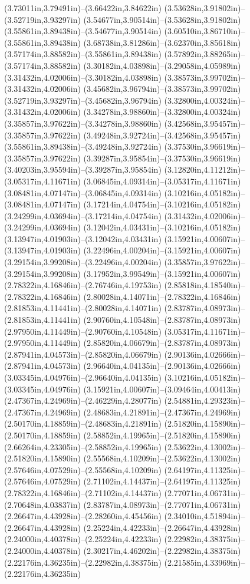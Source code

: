 (3.73011in,3.79491in)--(3.66422in,3.84622in) (3.53628in,3.91802in)--(3.52719in,3.93297in) (3.54677in,3.90514in)--(3.53628in,3.91802in) (3.55861in,3.89438in)--(3.54677in,3.90514in) (3.60510in,3.86710in)--(3.55861in,3.89438in) (3.68738in,3.81286in)--(3.62370in,3.85618in) (3.57174in,3.88582in)--(3.55861in,3.89438in) (3.57892in,3.88265in)--(3.57174in,3.88582in) (3.30182in,4.03898in)--(3.29058in,4.05989in) (3.31432in,4.02006in)--(3.30182in,4.03898in) (3.38573in,3.99702in)--(3.31432in,4.02006in) (3.45682in,3.96794in)--(3.38573in,3.99702in) (3.52719in,3.93297in)--(3.45682in,3.96794in) (3.32800in,4.00324in)--(3.31432in,4.02006in) (3.34278in,3.98860in)--(3.32800in,4.00324in) (3.35857in,3.97622in)--(3.34278in,3.98860in) (3.42568in,3.95457in)--(3.35857in,3.97622in) (3.49248in,3.92724in)--(3.42568in,3.95457in) (3.55861in,3.89438in)--(3.49248in,3.92724in) (3.37530in,3.96619in)--(3.35857in,3.97622in) (3.39287in,3.95854in)--(3.37530in,3.96619in) (3.40203in,3.95594in)--(3.39287in,3.95854in) (3.12820in,4.11212in)--(3.05317in,4.11671in) (3.06845in,4.09314in)--(3.05317in,4.11671in) (3.08481in,4.07147in)--(3.06845in,4.09314in) (3.10216in,4.05182in)--(3.08481in,4.07147in) (3.17214in,4.04754in)--(3.10216in,4.05182in) (3.24299in,4.03694in)--(3.17214in,4.04754in) (3.31432in,4.02006in)--(3.24299in,4.03694in) (3.12042in,4.03431in)--(3.10216in,4.05182in) (3.13947in,4.01903in)--(3.12042in,4.03431in) (3.15921in,4.00607in)--(3.13947in,4.01903in) (3.22496in,4.00204in)--(3.15921in,4.00607in) (3.29154in,3.99208in)--(3.22496in,4.00204in) (3.35857in,3.97622in)--(3.29154in,3.99208in) (3.17952in,3.99549in)--(3.15921in,4.00607in) (2.78322in,4.16846in)--(2.76746in,4.19753in) (2.85818in,4.18540in)--(2.78322in,4.16846in) (2.80028in,4.14071in)--(2.78322in,4.16846in) (2.81853in,4.11441in)--(2.80028in,4.14071in) (2.83787in,4.08973in)--(2.81853in,4.11441in) (2.90760in,4.10548in)--(2.83787in,4.08973in) (2.97950in,4.11449in)--(2.90760in,4.10548in) (3.05317in,4.11671in)--(2.97950in,4.11449in) (2.85820in,4.06679in)--(2.83787in,4.08973in) (2.87941in,4.04573in)--(2.85820in,4.06679in) (2.90136in,4.02666in)--(2.87941in,4.04573in) (2.96640in,4.04135in)--(2.90136in,4.02666in) (3.03345in,4.04976in)--(2.96640in,4.04135in) (3.10216in,4.05182in)--(3.03345in,4.04976in) (3.15921in,4.00607in)--(3.09464in,4.00413in) (2.47367in,4.24969in)--(2.46229in,4.28077in) (2.54881in,4.29323in)--(2.47367in,4.24969in) (2.48683in,4.21891in)--(2.47367in,4.24969in) (2.50170in,4.18859in)--(2.48683in,4.21891in) (2.51820in,4.15890in)--(2.50170in,4.18859in) (2.58852in,4.19965in)--(2.51820in,4.15890in) (2.66264in,4.23305in)--(2.58852in,4.19965in) (2.53622in,4.13002in)--(2.51820in,4.15890in) (2.55568in,4.10209in)--(2.53622in,4.13002in) (2.57646in,4.07529in)--(2.55568in,4.10209in) (2.64197in,4.11325in)--(2.57646in,4.07529in) (2.71102in,4.14437in)--(2.64197in,4.11325in) (2.78322in,4.16846in)--(2.71102in,4.14437in) (2.77071in,4.06731in)--(2.70648in,4.03837in) (2.83787in,4.08973in)--(2.77071in,4.06731in) (2.26647in,4.43928in)--(2.28260in,4.45456in) (2.34010in,4.51894in)--(2.26647in,4.43928in) (2.25224in,4.42233in)--(2.26647in,4.43928in) (2.24000in,4.40378in)--(2.25224in,4.42233in) (2.22982in,4.38375in)--(2.24000in,4.40378in) (2.30217in,4.46202in)--(2.22982in,4.38375in) (2.22176in,4.36235in)--(2.22982in,4.38375in) (2.21585in,4.33969in)--(2.22176in,4.36235in) 